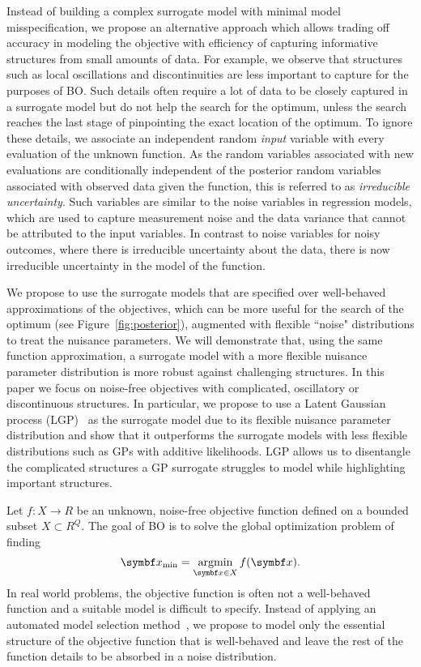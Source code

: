Instead of building a complex surrogate model with minimal model misspecification,
we propose an alternative approach which allows trading off accuracy in modeling the objective with efficiency of capturing informative structures from small amounts of data.
For example, we observe that structures such as local oscillations and discontinuities are less important to capture for the purposes of BO.
Such details often require a lot of data to be closely captured in a surrogate model but do not help the search for the optimum,
unless the search reaches the last stage of pinpointing the exact location of the optimum.
To ignore these details, we associate an independent random \emph{input} variable with every evaluation of the unknown function.
As the random variables associated with new evaluations are conditionally independent of the posterior random variables associated with observed data given the function,
this is referred to as \emph{irreducible uncertainty}.
Such variables are similar to the noise variables in regression models, which are used to capture measurement noise and the data variance that cannot be attributed to the input variables.
In contrast to noise variables for noisy outcomes,
where there is irreducible uncertainty about the data, there is now irreducible uncertainty in the model of the function.

We propose to use the surrogate models that are specified over well-behaved approximations of the objectives,
which can be more useful for the search of the optimum (see Figure~\ref{fig:posterior}), augmented with flexible ``noise" distributions to treat the nuisance parameters.
We will demonstrate that, using the same function approximation, a surrogate model with a more flexible nuisance parameter distribution is more robust against challenging structures.
In this paper we focus on noise-free objectives with complicated, oscillatory or discontinuous structures.
In particular, we propose to use a Latent Gaussian process (LGP)~\cite{pfingsten2006nonstationary,wang12_gauss_proces_regres_with_heter,yousefi_unsupervised_2016,bodin_latent_2017} as the surrogate model due to its flexible nuisance parameter distribution and show that it outperforms the surrogate models with less flexible distributions such as GPs with additive likelihoods.
LGP allows us to disentangle the complicated structures a GP surrogate struggles to model while highlighting important structures.

Let $f : X \to R$ be an unknown, noise-free objective function defined on a bounded subset $X \subset R^Q$.
The goal of BO is to solve the global optimization problem of finding
\begin{equation}
    \mat{x}_{\text{min}} = \argmin_{\mat{x} \in X} f(\mat{x}).
\end{equation}
In real world problems,
the objective function is often not a well-behaved function and a suitable model is difficult to specify.
Instead of applying an automated model selection method~\cite{malkomes2018automating},
we propose to model only the essential structure of the objective function that is well-behaved and leave the rest of the function details to be absorbed in a noise distribution.

